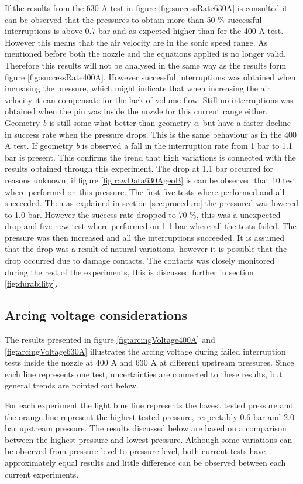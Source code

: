 \documentclass[10pt,a4paper,twoside]{article}
\begin{document}
If the results from the 630 A test in figure \ref{fig:successRate630A} is consulted it can be observed that the pressures to obtain more than 50 \% successful interruptions is above 0.7 bar and as expected higher than for the 400 A test. However this means that the air velocity are in the sonic speed range. As mentioned before both the nozzle and the equations applied is no longer valid. Therefore this results will not be analysed in the same way as the results form figure \ref{fig:successRate400A}. However successful interruptions was obtained when increasing the pressure, which might indicate that when increasing the air velocity it can compensate for the lack of volume flow. Still no interruptions was obtained when the pin was inside the nozzle for this current range either. Geometry \textit{b} is still some what better than geometry \textit{a}, but have a faster decline in success rate when the pressure drops. This is the same behaviour as in the 400 A test. If geometry \textit{b} is observed a fall in the interruption rate from 1 bar to 1.1 bar is present. This confirms the trend that high variations is connected with the results obtained through this experiment. The drop at 1.1 bar occurred for reasons unknown, if figure \ref{fig:rawData630AgeoB} is can be observed that 10 test where performed on this pressure. The first five tests where performed and all succeeded. Then as explained in section \ref{sec:procedure} the pressured was lowered to 1.0 bar. However the success rate dropped to 70 \%, this was a unexpected drop and five new test where performed on 1.1 bar where all the tests failed. The pressure was then increased and all the interruptions succeeded. It is assumed that the drop was a result of natural variations, however it is possible that the drop occurred due to damage contacts. The contacts was closely monitored during the rest of the experiments, this is discussed further in section \ref{fig:durability}.

\subsection{Arcing voltage considerations}
The results presented in figure \ref{fig:arcingVoltage400A} and \ref{fig:arcingVoltage630A} illustrates the arcing voltage during failed interruption tests inside the nozzle at 400 A and 630 A at different upstream pressures. Since each line represents one test, uncertainties are connected to these results, but general trends are pointed out below.

For each experiment the light blue line represents the lowest tested pressure and the orange line represent the highest tested pressure, respectably 0.6 bar and 2.0 bar upstream pressure. The results discussed below are based on a comparison between the highest pressure and lowest pressure. Although some variations can be observed from pressure level to pressure level, both current tests have approximately equal results and little difference can be observed between each current experiments.
\end{document}
